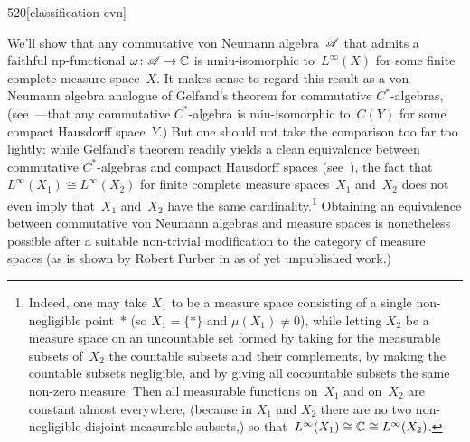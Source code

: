 \begin{parsec}{520}[classification-cvn]%
\begin{point}{10}%
We'll show that any commutative von Neumann algebra~$\mathscr{A}$
that admits a faithful np-functional $\omega\colon \mathscr{A}\to \mathbb{C}$
is nmiu-isomorphic  to~$L^\infty(X)$
for some finite complete measure space~$X$.
It makes sense to regard this result
as a von Neumann algebra analogue
of Gelfand's theorem for commutative $C^*$-algebras,
(see~---that any commutative $C^*$-algebra
is miu-isomorphic to~$C(Y)$ for some compact Hausdorff space~$Y$.)
But one should not take the
comparison too far too lightly:
while Gelfand's theorem readily
yields a clean equivalence 
between commutative $C^*$-algebras
and compact Hausdorff spaces
(see~),
the fact that  $L^\infty(X_1)\cong L^\infty(X_2)$
for finite complete measure spaces~$X_1$
and~$X_2$ does not even imply that~$X_1$ and~$X_2$ have
	the same cardinality.\footnote{Indeed, one may take
	$X_1$ to be a measure space consisting of a
	single non-negligible point~$*$ (so $X_1=\{*\}$
	and $\mu(X_1)\neq 0$),
	while letting $X_2$ be a measure space
	on an uncountable set
	formed by taking for the measurable subsets
	of~$X_2$ the countable subsets
	and their complements,
	by making the countable subsets negligible,
	and by giving all cocountable subsets
	the same non-zero measure.
	Then all measurable functions
	on~$X_1$ and on~$X_2$
	are constant almost everywhere,
	(because in $X_1$ and $X_2$ there are no 
	two non-negligible disjoint measurable subsets,)
	so that~$L^\infty(X_1)\cong \mathbb{C}\cong L^\infty(X_2)$.}
Obtaining an equivalence between commutative von Neumann algebras
and measure spaces is nonetheless
possible after a suitable non-trivial modification
to the category of measure spaces
(as is shown by Robert Furber 
in as of yet unpublished work.)


\end{point}
\end{parsec}
